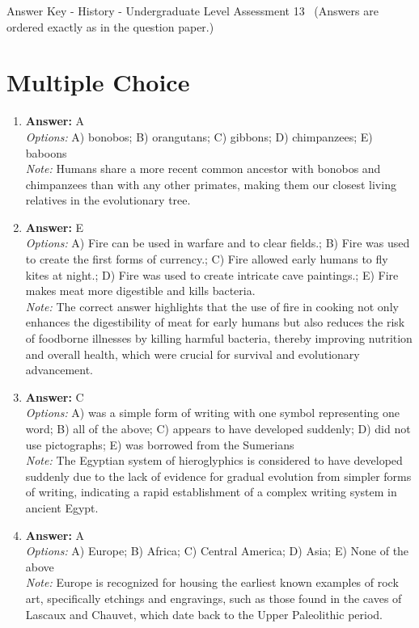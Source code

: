 \documentclass[12pt]{article}
\begin{document}
\begin{center}
Answer Key - History - Undergraduate Level Assessment 13 \
\small (Answers are ordered exactly as in the question paper.)
\end{center}

\section*{Multiple Choice}
\begin{enumerate}[label=\arabic*.]
\item \textbf{Answer:} A
\\ \textit{Options:} A) bonobos; B) orangutans; C) gibbons; D) chimpanzees; E) baboons
\\ \textit{Note:} Humans share a more recent common ancestor with bonobos and chimpanzees than with any other primates, making them our closest living relatives in the evolutionary tree.
\item \textbf{Answer:} E
\\ \textit{Options:} A) Fire can be used in warfare and to clear fields.; B) Fire was used to create the first forms of currency.; C) Fire allowed early humans to fly kites at night.; D) Fire was used to create intricate cave paintings.; E) Fire makes meat more digestible and kills bacteria.
\\ \textit{Note:} The correct answer highlights that the use of fire in cooking not only enhances the digestibility of meat for early humans but also reduces the risk of foodborne illnesses by killing harmful bacteria, thereby improving nutrition and overall health, which were crucial for survival and evolutionary advancement.
\item \textbf{Answer:} C
\\ \textit{Options:} A) was a simple form of writing with one symbol representing one word; B) all of the above; C) appears to have developed suddenly; D) did not use pictographs; E) was borrowed from the Sumerians
\\ \textit{Note:} The Egyptian system of hieroglyphics is considered to have developed suddenly due to the lack of evidence for gradual evolution from simpler forms of writing, indicating a rapid establishment of a complex writing system in ancient Egypt.
\item \textbf{Answer:} A
\\ \textit{Options:} A) Europe; B) Africa; C) Central America; D) Asia; E) None of the above
\\ \textit{Note:} Europe is recognized for housing the earliest known examples of rock art, specifically etchings and engravings, such as those found in the caves of Lascaux and Chauvet, which date back to the Upper Paleolithic period.

\end{enumerate}
\end{document}
